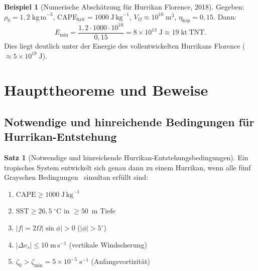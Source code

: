 ﻿\documentclass[a4paper,12pt]{article}
\theoremstyle{definition}
\newtheorem{beispiel}{Beispiel}
\newtheorem{satz}{Satz}
\begin{document}
\begin{beispiel}[Numerische Absch\"{a}tzung f\"{u}r Hurrikan Florence, 2018]
Gegeben: $\rho_{0}=1{,}2\;\mathrm{kg\,m}^{-3}$,
$\mathrm{CAPE}_{\mathrm{krit}}=1000\;\mathrm{J\,kg}^{-1}$,
$V_{\Omega}\approx 10^{10}\;\mathrm{m}^{3}$,
$\eta_{\mathrm{kop}}=0{,}15$.
Dann:
\[
    E_{\min}=\frac{1{,}2\cdot 1000\cdot 10^{10}}{0{,}15}
    =8\times 10^{13}\;\mathrm{J}
    \approx 19\;\mathrm{kt~TNT}.
\]
Dies liegt deutlich unter der Energie des vollentwickelten Hurrikans Florence
($\approx 5\times 10^{19}\;\mathrm{J}$).
\end{beispiel}

\section{Haupttheoreme und Beweise}

\subsection{Notwendige und hinreichende Bedingungen f\"{u}r Hurrikan-Entstehung}

\begin{satz}[Notwendige und hinreichende Hurrikan-Entstehungsbedingungen]
\label{satz:bed}
Ein tropisches System entwickelt sich genau dann zu einem Hurrikan,
wenn alle f\"{u}nf Grayschen Bedingungen~\cite{gray1968} simultan erf\"{u}llt sind:
\begin{enumerate}
    \item[(B1)] $\mathrm{CAPE}\geq 1000\;\mathrm{J\,kg}^{-1}$
    \item[(B2)] $\mathrm{SST}\geq 26{,}5\;{}^{\circ}\mathrm{C}$ in $\geq50$~m Tiefe
    \item[(B3)] $|f|=2\Omega|\sin\phi|>0$ \quad($|\phi|>5^{\circ}$)
    \item[(B4)] $|\Delta v_{s}|\leq 10\;\mathrm{m\,s}^{-1}$ (vertikale Windscherung)
    \item[(B5)] $\zeta_{0}>\zeta_{\min}=5\times 10^{-5}\;\mathrm{s}^{-1}$
                (Anfangsvortizit\"{a}t)
\end{enumerate}
\end{satz}
\end{document}
